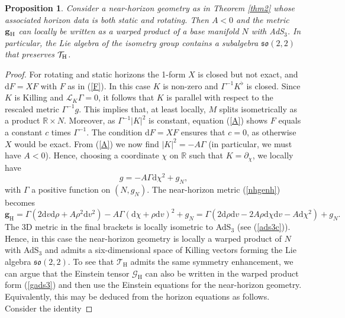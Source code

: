 \documentclass[11pt, reqno]{amsart}
\newcommand{\R}{\mathbb{R}}
\theoremstyle{plain}
\newtheorem{prop}[theorem]{Proposition}
\theoremstyle{definition}
\numberwithin{equation}{section}
\begin{document}
\begin{prop} \label{propads3}
Consider a near-horizon geometry as in Theorem \ref{thm2} whose associated horizon data is both static and rotating. Then $A < 0$ and the metric $\textup{\textbf{g}}_{\textup{H}}$ can locally be written as a warped product of a base manifold $N$ with \textup{AdS}$_3$. In particular, the Lie algebra of the isometry group contains a subalgebra $\mathfrak{so}(2,2)$ that preserves $\mathcal{T}_{\textup{H}}$.
\end{prop}
\begin{proof}
    For rotating and static horizons the 1-form $X$ is closed but not exact, and d$F = XF$ with $F$ as in (\ref{F}). In this case $K$ is non-zero and $\Gamma^{-1}K^\flat$ is closed. Since $K$ is Killing and $\mathcal{L}_K \Gamma = 0$, it follows that $K$ is parallel with respect to the rescaled metric $\Gamma^{-1}g$. This implies that, at least locally, $M$ splits isometrically as a product $\R \times N$. Moreover, as $\Gamma^{-1}\vert K \vert^2$ is constant, equation (\ref{A}) shows $F$ equals a constant $c$ times $\Gamma^{-1}$. The condition d$F = XF$ ensures that $c = 0$, as otherwise $X$ would be exact. From (\ref{A}) we now find $\vert K \vert^2 = -A\Gamma$ (in particular, we must have $A < 0$). Hence, choosing a coordinate $\chi$ on $\R$ such that $K = \partial_\chi$, we locally have
    \begin{equation} \label{wp}
        g = -A\Gamma \text{d}\chi^2 + g_N,
    \end{equation}
    with $\Gamma$ a positive function on $(N,g_N)$. The near-horizon metric (\ref{nhgenh}) becomes
    \begin{equation} \label{gads3}
        \textbf{g}_{\text{H}} = \Gamma(2\text{d}v\text{d}\rho + A\rho^2\text{d}v^2) -A\Gamma(\text{d}\chi + \rho\text{d}v)^2 + g_N = \Gamma(2\text{d}\rho\text{d}v - 2A\rho\text{d}\chi\text{d}v - A\text{d}\chi^2) + g_N.
    \end{equation}
    The 3D metric in the final brackets is locally isometric to AdS$_3$ (see (\ref{ads3c})). Hence, in this case the near-horizon geometry is locally a warped product of $N$ with AdS$_3$ and admits a six-dimensional space of Killing vectors forming the Lie algebra $\mathfrak{so}(2,2)$. To see that $\mathcal{T}_{\text{H}}$ admits the same symmetry enhancement, we can argue that the Einstein tensor $\mathcal{G}_{\text{H}}$ can also be written in the warped product form (\ref{gads3}) and then use the Einstein equations for the near-horizon geometry. Equivalently, this may be deduced from the horizon equations as follows. Consider the identity

\end{proof}
\end{document}
